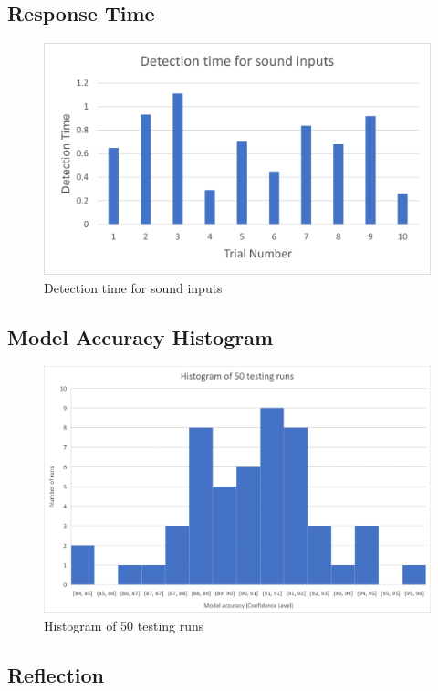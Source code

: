 \documentclass[12pt, titlepage]{article}
\begin{document}
\subsection*{Response Time}
\begin{figure}[H]
  \includegraphics[width=\textwidth,height=\textheight,keepaspectratio]{Responce_time.png}
  \caption{Detection time for sound inputs}
  \label{Response} 
\end{figure}
\subsection*{Model Accuracy Histogram}
\begin{figure}[H]
  \includegraphics[width=\textwidth,height=\textheight,keepaspectratio]{confidence_level.png}
  \caption{Histogram of 50 testing runs}
  \label{Histogram} 
\end{figure}


\subsection{Reflection}
\end{document}
